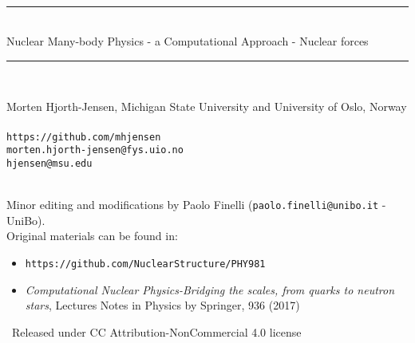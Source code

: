 \documentclass[graybox,sectrefs,envcountresetchap,open=right]{svmonodo}
\begin{document}






\frontmatter
\setcounter{page}{3}
\pagestyle{headings}



\thispagestyle{empty}
\hbox{\ \ }
\vfill
\begin{center}
{\huge{\bfseries{
\begin{spacing}{1.25}
{\rule{\linewidth}{0.5mm}} \\[0.4cm]
{Nuclear Many-body Physics \quad \quad - a Computational Approach - Nuclear forces}
\\[0.4cm] {\rule{\linewidth}{0.5mm}} \\[1.5cm]
\end{spacing}
}}}


\vspace{2.5cm}

{\Large\textsf{Morten Hjorth-Jensen, Michigan State University and University of Oslo, Norway${}^{}$}}\\~\\{\tt https://github.com/mhjensen}\\
{\tt morten.hjorth-jensen@fys.uio.no}\\ {\tt hjensen@msu.edu}\\ [3mm]

\ \\ [2mm]
\vspace{1.5cm}
\begin{flushleft}
Minor editing and modifications by Paolo Finelli ({\tt paolo.finelli@unibo.it} - UniBo).\\
Original materials can be found in:
\begin{itemize}
\item {\tt https://github.com/NuclearStructure/PHY981}
\item {\it  Computational Nuclear Physics-Bridging the scales, from quarks to neutron stars}, Lectures Notes in Physics by Springer, 936 (2017)
\end{itemize}
\vspace{.5cm} 
\textcopyright~Released under CC Attribution-NonCommercial 4.0 license
\end{flushleft}




\end{center}
\vfill
\clearpage
\end{document}
